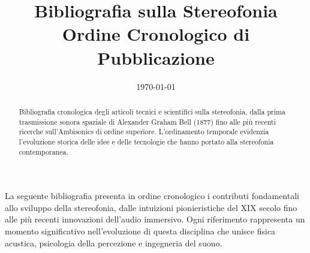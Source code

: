 \documentclass[11pt,a4paper]{article}
\title{Bibliografia sulla Stereofonia\\Ordine Cronologico di Pubblicazione}
\author{}
\date{\today}
\begin{document}
\maketitle

\begin{abstract}
Bibliografia cronologica degli articoli tecnici e scientifici sulla stereofonia, dalla prima trasmissione sonora spaziale di Alexander Graham Bell (1877) fino alle più recenti ricerche sull'Ambisonics di ordine superiore. L'ordinamento temporale evidenzia l'evoluzione storica delle idee e delle tecnologie che hanno portato alla stereofonia contemporanea.
\end{abstract}

\vspace{1cm}

\noindent La seguente bibliografia presenta in ordine cronologico i contributi fondamentali allo sviluppo della stereofonia, dalle intuizioni pionieristiche del XIX secolo fino alle più recenti innovazioni dell'audio immersivo. Ogni riferimento rappresenta un momento significativo nell'evoluzione di questa disciplina che unisce fisica acustica, psicologia della percezione e ingegneria del suono.

\vspace{0.5cm}

\nocite{bell1877}
\nocite{edison1877}
\nocite{dolbear1879}
\nocite{preece1879}
\nocite{ader1881}
\nocite{ader1881patent}
\nocite{du_moncel1882}
\nocite{tainter1886}
\nocite{berliner1888}
\nocite{bartok1889}
\nocite{hospitalier1889}
\nocite{puskas1893}
\nocite{hunnings1899}
\nocite{koenig1899}
\nocite{rayleigh1907}
\nocite{electrician1925}
\nocite{fletcher1928}
\nocite{steinberg1929}
\nocite{wente1930}
\nocite{blumlein1931}
\nocite{fletcher1934}
\nocite{steinberg1934}
\nocite{clark1957}
\nocite{mills1958}
\nocite{klapholz1958}
\nocite{bauer1961}
\nocite{schroeder1961}
\nocite{blauert1969}
\nocite{cooper1960}
\nocite{gerzon1973}
\nocite{gerzon1975}
\nocite{gerzon1977}
\nocite{blauert1983}
\nocite{gerzon1992}
\nocite{lipshitz1986}
\nocite{williams1987}
\nocite{wightman1989}
\nocite{berkhout1993}
\nocite{begault1994}
\nocite{moore1995}
\nocite{bosi1997}
\nocite{pulkki1997}
\nocite{algazi2001}
\nocite{cheng2001}
\nocite{daniel2003}
\nocite{joseph2007}
\nocite{itu2012}
\nocite{frank2013}
\nocite{zotter2019}


\end{document}
